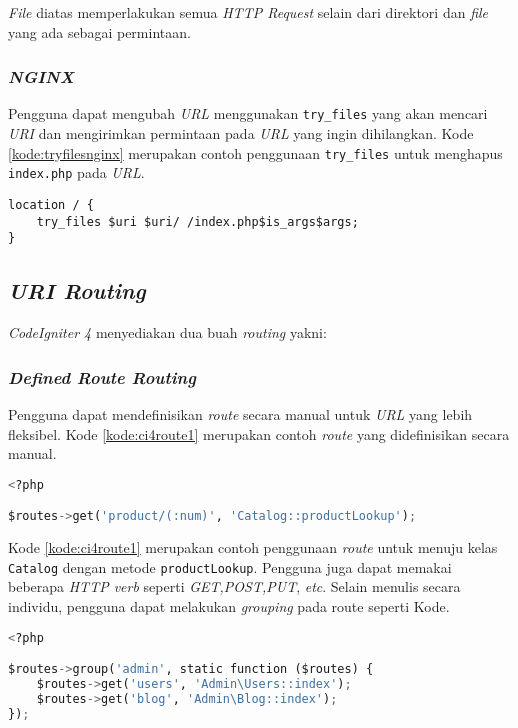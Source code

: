 \textit{File} diatas memperlakukan semua \textit{HTTP Request} selain dari direktori dan \textit{file} yang ada sebagai permintaan.

\subsubsection{\textit{NGINX}}
Pengguna dapat mengubah \textit{URL} menggunakan \verb|try_files| yang akan mencari \textit{URI} dan mengirimkan permintaan pada \textit{URL} yang ingin dihilangkan. Kode \ref{kode:tryfilesnginx} merupakan contoh penggunaan \verb|try_files| untuk menghapus \verb|index.php| pada \textit{URL}.

\begin{lstlisting}[caption=Contoh penggunaan \texttt{try-files}. ,label=kode:tryfilesnginx]
location / {
    try_files $uri $uri/ /index.php$is_args$args;
}
\end{lstlisting}

\subsection{\textit{URI Routing}}
\textit{CodeIgniter 4} menyediakan dua buah \textit{routing} yakni:
\subsubsection{\textit{Defined Route Routing}}
Pengguna dapat mendefinisikan \textit{route} secara manual untuk \textit{URL} yang lebih fleksibel. Kode \ref{kode:ci4route1} merupakan contoh \textit{route} yang didefinisikan secara manual.
\begin{lstlisting}[language=Python,caption=Contoh \textit{route} yang didefinisikan secara manual,label=kode:ci4route1]
<?php

$routes->get('product/(:num)', 'Catalog::productLookup');
\end{lstlisting}
Kode \ref{kode:ci4route1} merupakan contoh penggunaan \textit{route} untuk menuju kelas \texttt{Catalog} dengan metode \texttt{productLookup}. Pengguna juga dapat memakai beberapa \textit{HTTP verb} seperti \textit{GET,POST,PUT}, \textit{etc}. Selain menulis secara individu, pengguna dapat melakukan \textit{grouping} pada route seperti Kode.
\begin{lstlisting}[language=Python,caption=Contoh \textit{route} yang menggunakan \textit{grouping} manual,label=kode:ci4routegroup]
<?php

$routes->group('admin', static function ($routes) {
    $routes->get('users', 'Admin\Users::index');
    $routes->get('blog', 'Admin\Blog::index');
});
\end{lstlisting}

